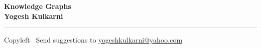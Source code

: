 
\graphicspath{{images/}}

\footnotesize


\begin{center}
\Large{\textbf{Knowledge Graphs\\ Yogesh Kulkarni}}  
\end{center}

\begin{multicols}{2}

\end{multicols}

\rule{\linewidth}{0.25pt}
\scriptsize
Copyleft \textcopyleft\  Send suggestions to 
\href{http://www.yogeshkulkarni.com}{yogeshkulkarni@yahoo.com}


